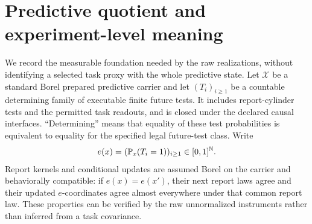 \section{Predictive quotient and experiment-level meaning}\label{app:quotient}
We record the measurable foundation needed by the raw realizations, without identifying a selected task proxy with the whole predictive state. Let $\mathcal X$ be a standard Borel prepared predictive carrier and let $(T_i)_{i\ge1}$ be a countable determining family of executable finite future tests. It includes report-cylinder tests and the permitted task readouts, and is closed under the declared causal interfaces. ``Determining'' means that equality of these test probabilities is equivalent to equality for the specified legal future-test class. Write
\[
 e(x)=(\mathbb P_x(T_i=1))_{i\ge1}\in[0,1]^{\mathbb N}.
\]
Report kernels and conditional updates are assumed Borel on the carrier and behaviorally compatible: if $e(x)=e(x')$, their next report laws agree and their updated $e$-coordinates agree almost everywhere under that common report law. These properties can be verified by the raw unnormalized instruments rather than inferred from a task covariance.

